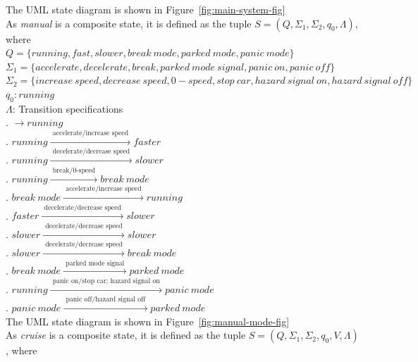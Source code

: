 \documentclass[12pt]{article}
\begin{document}
\begin{spacing}{1.5}
\noindent The UML state diagram is shown in Figure~\ref{fig:main-system-fig}\\


\noindent As \textit{manual} is a composite state, it is defined as the tuple $S = (Q, \Sigma_1, \Sigma_2, q_0, \Lambda)$, where\\

\noindent $Q = \{running, fast, slower, break~mode, parked~mode, panic~mode\}$\\
\noindent $\Sigma_1 = \{accelerate, decelerate, break, parked~mode~signal,  panic~on, panic~off\}$\\
\noindent $\Sigma_2 = \{increase~speed, decrease~speed, 0-speed, stop~car, hazard~signal~on, hazard~signal~off\}$\\
\noindent $q_0: running$\\
\noindent $\Lambda$: Transition specifications\\
. $\rightarrow running$\\
. $running \xrightarrow {\text { accelerate/increase speed }} faster$\\
. $running \xrightarrow {\text { decelerate/decrease speed }} slower$\\
. $running \xrightarrow {\text { break/0-speed }} break~mode$\\
. $break~mode \xrightarrow {\text { accelerate/increase speed }} running$\\
. $faster \xrightarrow {\text { decelerate/decrease speed }} slower$\\
. $slower \xrightarrow {\text { decelerate/decrease speed }} slower$\\
. $slower \xrightarrow {\text { decelerate/decrease speed }} break~mode$\\
. $break~mode \xrightarrow {\text { parked mode signal }} parked~mode$\\
. $running \xrightarrow {\text { panic on/stop car; hazard signal on }} panic~mode$\\
. $panic~mode \xrightarrow {\text { panic off/hazard signal off }} parked~mode$\\

\noindent The UML state diagram is shown in Figure~\ref{fig:manual-mode-fig}\\


\noindent As \textit{cruise} is a composite state, it is defined as the tuple $S = (Q, \Sigma_1, \Sigma_2, q_0, V, \Lambda)$, where\\


\end{spacing}
\end{document}
